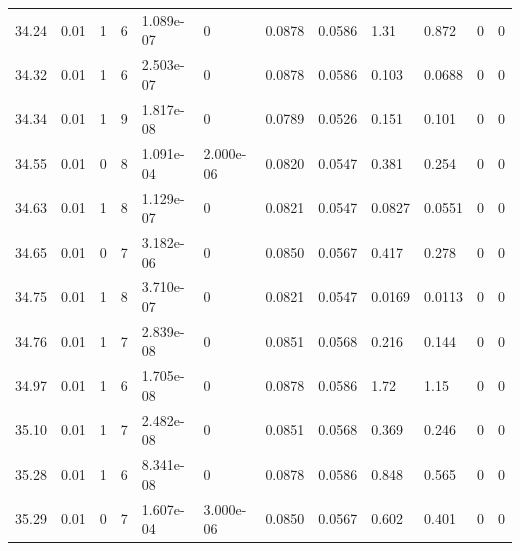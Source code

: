 \documentclass[preview]{standalone}
\begin{document}
{{{{{{{{{\begin{tabular}{L{1.2cm}C{1.2cm} C{0.3cm}C{0.5cm} C{1.4cm}C{1.4cm} C{1.4cm}C{1.4cm} C{1.6cm}C{1.6cm} C{1.6cm}C{1.6cm}}
  34.24  &  0.01  & 1     &  6 &  1.089e-07  & 0  &  0.0878&   0.0586& 1.31 & 0.872   &  0 & 0  \\ 
  34.32  &  0.01  & 1     &  6 &  2.503e-07  & 0  &  0.0878&   0.0586& 0.103 & 0.0688   &  0 & 0  \\ 
  34.34  &  0.01  & 1     &  9 &  1.817e-08  & 0  &  0.0789&   0.0526& 0.151 & 0.101   &  0 & 0  \\ 
  34.55  &  0.01  & 0     &  8 &  1.091e-04  & 2.000e-06  &  0.0820&   0.0547& 0.381 & 0.254   &  0 & 0  \\ 
  34.63  &  0.01  & 1     &  8 &  1.129e-07  & 0  &  0.0821&   0.0547& 0.0827 & 0.0551   &  0 & 0  \\ 
  34.65  &  0.01  & 0     &  7 &  3.182e-06  & 0  &  0.0850&   0.0567& 0.417 & 0.278   &  0 & 0  \\ 
  34.75  &  0.01  & 1     &  8 &  3.710e-07  & 0  &  0.0821&   0.0547& 0.0169 & 0.0113   &  0 & 0  \\ 
  34.76  &  0.01  & 1     &  7 &  2.839e-08  & 0  &  0.0851&   0.0568& 0.216 & 0.144   &  0 & 0  \\ 
  34.97  &  0.01  & 1     &  6 &  1.705e-08  & 0  &  0.0878&   0.0586& 1.72 & 1.15   &  0 & 0  \\ 
  35.10  &  0.01  & 1     &  7 &  2.482e-08  & 0  &  0.0851&   0.0568& 0.369 & 0.246   &  0 & 0  \\ 
  35.28  &  0.01  & 1     &  6 &  8.341e-08  & 0  &  0.0878&   0.0586& 0.848 & 0.565   &  0 & 0  \\ 
  35.29  &  0.01  & 0     &  7 &  1.607e-04  & 3.000e-06  &  0.0850&   0.0567& 0.602 & 0.401   &  0 & 0  \\ 
\hline 
\end{tabular} 

}}}}}}}}}
\end{document}
